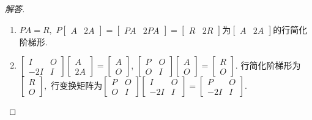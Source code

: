 \documentclass[UTF8]{ctexart}
\begin{document}
\begin{proof}[解答]
\begin{enumerate}
\item $PA = R,$ $P \begin{bmatrix} A & 2A  \end{bmatrix} = \begin{bmatrix} PA & 2PA  \end{bmatrix} = \begin{bmatrix} R & 2R  \end{bmatrix}$为$\begin{bmatrix} A & 2A  \end{bmatrix}$的行简化阶梯形.

\item $\begin{bmatrix} I & O \\ -2I & I  \end{bmatrix} \begin{bmatrix} A \\  2A  \end{bmatrix} = \begin{bmatrix} A \\  O  \end{bmatrix}$, $\begin{bmatrix} P & O \\ O & I  \end{bmatrix}\begin{bmatrix} A \\  O  \end{bmatrix} = \begin{bmatrix} R \\  O  \end{bmatrix}.$ 行简化阶梯形为$\begin{bmatrix} R \\  O  \end{bmatrix},$ 行变换矩阵为$\begin{bmatrix} P & O \\ O & I  \end{bmatrix} \begin{bmatrix} I & O \\ -2I & I  \end{bmatrix}  = \begin{bmatrix} P & O \\ -2I & I  \end{bmatrix} .$
\end{enumerate}
\end{proof}
\end{document}
